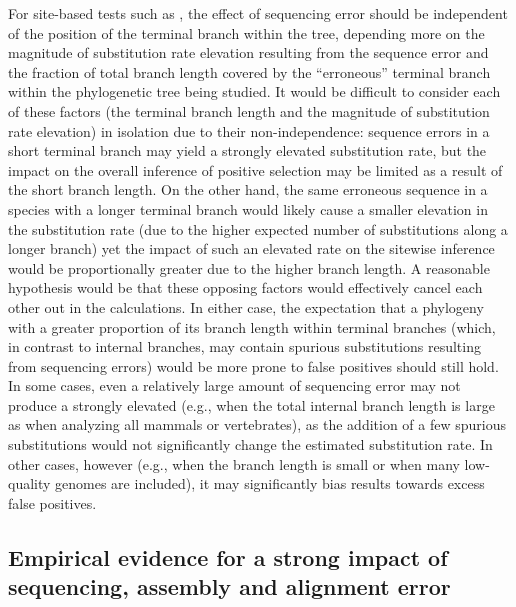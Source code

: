 For site-based tests such as \slr, the effect of sequencing error
should be independent of the position of the terminal branch within
the tree, depending more on the magnitude of \nsyn substitution rate
elevation resulting from the sequence error and the fraction of total
branch length covered by the ``erroneous'' terminal branch within the
phylogenetic tree being studied. It would be difficult to consider
each of these factors (the terminal branch length and the magnitude of
\nsyn substitution rate elevation) in isolation due to their
non-independence: sequence errors in a short terminal branch may yield
a strongly elevated \nsyn substitution rate, but the impact on the
overall inference of positive selection may be limited as a result of
the short branch length. On the other hand, the same erroneous
sequence in a species with a longer terminal branch would likely cause
a smaller elevation in the \nsyn substitution rate (due to the higher
expected number of substitutions along a longer branch) yet the impact
of such an elevated rate on the sitewise inference would be
proportionally greater due to the higher branch length. A reasonable
hypothesis would be that these opposing factors would effectively
cancel each other out in the \ml calculations. In either case, the
expectation that a phylogeny with a greater proportion of its branch
length within terminal branches (which, in contrast to internal
branches, may contain spurious substitutions resulting from sequencing
errors) would be more prone to false positives should still hold.
In some cases, even a relatively large amount of
sequencing error may not produce a strongly elevated \fpr (e.g., when
the total internal branch length is large as when analyzing all
mammals or vertebrates), as the addition of a few spurious
substitutions would not significantly change the estimated \nsyn
substitution rate. In other cases, however (e.g., when the branch
length is small or when many low-quality genomes are included), it may
significantly bias results towards excess false positives.

\subsection{Empirical evidence for a strong impact of sequencing, assembly and alignment error}

